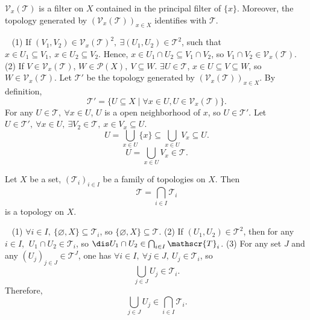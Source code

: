 \begin{propositionenv}
    $\mathcal{V}_x(\mathscr{T})$ is a filter on $X$ contained in the principal filter of $\{x\}$. Moreover, the topology generated by $\left(\mathcal{V}_x(\mathscr{T})\right)_{x\in X}$ identifies with $\mathscr{T}$.
\end{propositionenv}
\begin{proofenv}
    \ \newline
    (1) If $(V_1,V_2)\in \mathcal{V}_x(\mathscr{T})^2,\ \exists (U_1,U_2)\in \mathscr{T}^2$, such that $x\in U_1\subseteq V_1,\ x\in U_2\subseteq V_2$. Hence, $x\in U_1\cap U_2\subseteq V_1\cap V_2$, so $V_1\cap V_2\in \mathcal{V}_{x}(\mathscr{T})$.
    \newline
    (2) If $V\in \mathcal{V}_x(\mathscr{T})$, $W\in \mathscr{P}(X),\ V\subseteq W$. $\exists U\in \mathscr{T}$, $x\in U\subseteq V\subseteq W$, so $W\in \mathcal{V}_x(\mathscr{T})$. Let $\mathscr{T}'$ be the topology generated by $\left(\mathcal{V}_x(\mathscr{T})\right)_{x\in X}$. By definition,
    $$\mathscr{T}'=\{U\subseteq X\mid \forall x\in U, U\in \mathcal{V}_x(\mathscr{T})\}.$$
    For any $U\in \mathscr{T},\ \forall x\in U  $, $U$ is a open neighborhood of $x$, so $U\in \mathscr{T}'$. Let $U\in \mathscr{T}', \ \forall x\in U,\ \exists V_2\in \mathscr{T},\ x\in V_x\subseteq U$.
    $$U=\bigcup_{x\in U}\{x\}\subseteq \bigcup_{x\in U}V_x\subseteq U.$$
    $$U=\bigcup_{x\in U}V_x\in \mathscr{T}.$$
\end{proofenv}
\begin{propositionenv}
    Let $X$ be a set, $\left(\mathscr{T}_i\right)_{i\in I}$ be a family of topologies on $X$. Then 
    $$\mathscr{T}=\bigcap_{i\in I}\mathscr{T}_i$$
    is a topology on $X$.
\end{propositionenv}
\begin{proofenv}
    \ \newline
    (1) $\forall i\in I,\ \{\varnothing,X\}\subseteq \mathscr{T}_i$, so $\{\varnothing,X\}\subseteq \mathscr{T}$.
    \newline
    (2) If $(U_1,U_2)\in \mathscr{T}^2$, then for any $i\in I$, $\ U_1\cap U_2\in \mathscr{T}_i$, so $\dis U_1\cap U_2\in \bigcap_{i\in I}\mathscr{T}_i$.
    \newline
    (3) For any set $J$ and any $\left(U_j\right)_{j\in J}\in \mathscr{T}^J$, one has $\forall i\in I,\ \forall j\in J,\ U_j\in \mathscr{T}_i$, so
    $$\bigcup_{j\in J}U_j\in \mathscr{T}_i.$$
    Therefore, $$\bigcup_{j\in J}U_j\in \bigcap_{i\in I}\mathscr{T}_i.$$ 
\end{proofenv}

